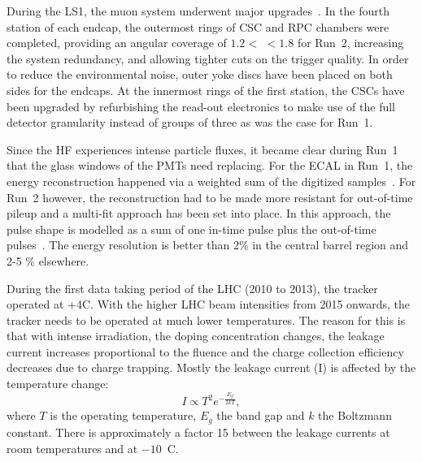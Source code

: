 During the LS1, the  muon system underwent major upgrades~\cite{Guiducci:1966038,Battilana:2239185}. In the fourth station of each endcap, the outermost rings of CSC and RPC chambers were completed, providing an angular coverage of $1.2<$ \abspsrap $<1.8$ for Run~2, increasing the system redundancy, and allowing tighter cuts on the trigger quality. In order to reduce the environmental noise, outer yoke discs have been placed on both sides for the endcaps. 
At the innermost rings of the first station, the CSCs have been upgraded by refurbishing the read-out electronics to make use of the full detector granularity instead of groups of three as was the case for Run~1. 

Since the HF experiences intense particle fluxes, it became clear during Run~1 that the glass windows of the PMTs need replacing. For the ECAL in Run~1, the energy reconstruction happened  via a weighted sum of the digitized samples~\cite{Chatrchyan:2013dga}. For Run~2 however, the reconstruction had to be made more resistant for out-of-time pileup and a multi-fit approach has been set into place. In this approach, the pulse shape is modelled as a sum of one in-time pulse plus the out-of-time pulses~\cite{1748-0221-12-01-C01069}. The energy resolution is better than 2\%  in the central barrel region and 2-5 \% elsewhere.

 During the first data taking period of the LHC (2010 to 2013), the tracker operated at +4\degree C. With the higher LHC beam intensities from 2015 onwards, the tracker needs to be operated at much lower temperatures. The reason for this is that with intense irradiation, the doping concentration changes, the leakage current increases proportional to the fluence and the charge collection efficiency decreases due to charge trapping. Mostly the leakage current (I) is affected by the temperature change: 
\begin{equation}
I \propto T^2 e^{-\frac{E_g}{2kT}}, 
\end{equation}
where $T$ is the operating temperature, $E_g$ the band gap and $k$ the Boltzmann constant. There is approximately a factor 15 between the leakage currents at room temperatures and at $-10$~\degree C. 

